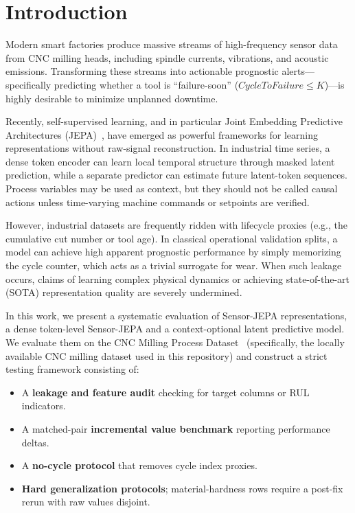 \documentclass[10pt,journal,compsoc]{IEEEtran}
\begin{document}
\maketitle

\IEEEdisplaynontitleabstractindextext
\IEEEpeerreviewmaketitle

\section{Introduction}
Modern smart factories produce massive streams of high-frequency sensor data from CNC milling heads, including spindle currents, vibrations, and acoustic emissions. Transforming these streams into actionable prognostic alerts---specifically predicting whether a tool is ``failure-soon'' ($CycleToFailure \le K$)---is highly desirable to minimize unplanned downtime.

Recently, self-supervised learning, and in particular Joint Embedding Predictive Architectures (JEPA)~\cite{assran2023ijepa}, have emerged as powerful frameworks for learning representations without raw-signal reconstruction. In industrial time series, a dense token encoder can learn local temporal structure through masked latent prediction, while a separate predictor can estimate future latent-token sequences. Process variables may be used as context, but they should not be called causal actions unless time-varying machine commands or setpoints are verified.

However, industrial datasets are frequently ridden with lifecycle proxies (e.g., the cumulative cut number or tool age). In classical operational validation splits, a model can achieve high apparent prognostic performance by simply memorizing the cycle counter, which acts as a trivial surrogate for wear. When such leakage occurs, claims of learning complex physical dynamics or achieving state-of-the-art (SOTA) representation quality are severely undermined.

In this work, we present a systematic evaluation of Sensor-JEPA representations, a dense token-level Sensor-JEPA and a context-optional latent predictive model. We evaluate them on the CNC Milling Process Dataset~\cite{nasa_cnc_dataset} (specifically, the locally available CNC milling dataset used in this repository) and construct a strict testing framework consisting of:
\begin{itemize}
    \item A \textbf{leakage and feature audit} checking for target columns or RUL indicators.
    \item A matched-pair \textbf{incremental value benchmark} reporting performance deltas.
    \item A \textbf{no-cycle protocol} that removes cycle index proxies.
    \item \textbf{Hard generalization protocols}; material-hardness rows require a post-fix rerun with raw values disjoint.
\end{itemize}
\end{document}
